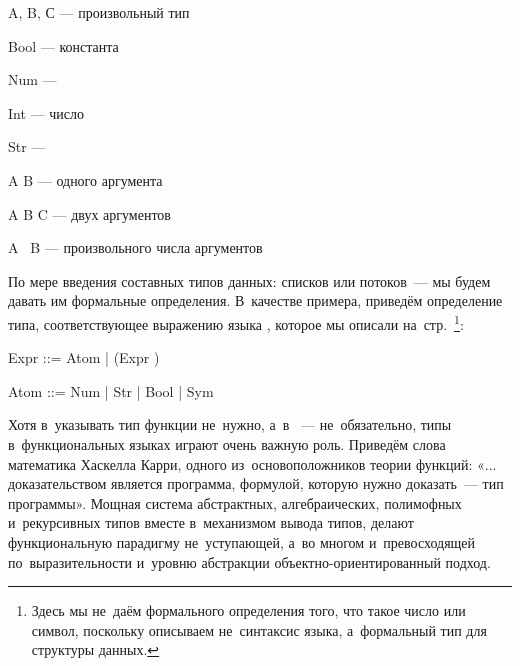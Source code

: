 \vspace{-\bigskipamount}
\begin{type}
   \item A, B, С --- {\TextComment произвольный тип}
   \item Bool --- { константа}
   \item Num --- {}
   \item Int --- { число}
   \item Str --- {}
   \item A \arrow B --- { одного аргумента}
   \item A B \arrow C --- { двух аргументов}
   \item A \ddd\ \arrow B --- { произвольного числа аргументов}
\end{type}

По мере введения составных типов данных: списков или потоков~--- мы будем давать им формальные определения. В~качестве примера, приведём определение типа, соответствующее выражению языка \Scheme, которое мы описали на~стр.~\pageref{Sec:expressions}\footnote{Здесь мы не~даём формального определения того, что такое число или символ, поскольку описываем не~синтаксис языка, а~формальный тип для структуры данных.}:

\vspace{-\medskipamount}
\begin{type}
\item Expr ::= Atom | (Expr \ddd)
\item Atom ::= Num | Str | Bool | Sym
\end{type}

Хотя в~\Scheme указывать тип функции не~нужно, а~в ~--- не~обязательно, типы в~функциональных языках играют очень важную роль. Приведём слова математика Хаскелла Карри, одного из~основоположников теории функций: «... доказательством является программа, формулой, которую нужно доказать~--- тип программы». Мощная система абстрактных, алгебраических, полимофных и~рекурсивных типов вместе в~механизмом вывода типов, делают функциональную парадигму не~уступающей, а~во многом и~превосходящей по~выразительности и~уровню абстракции объектно-ориентированный подход.

